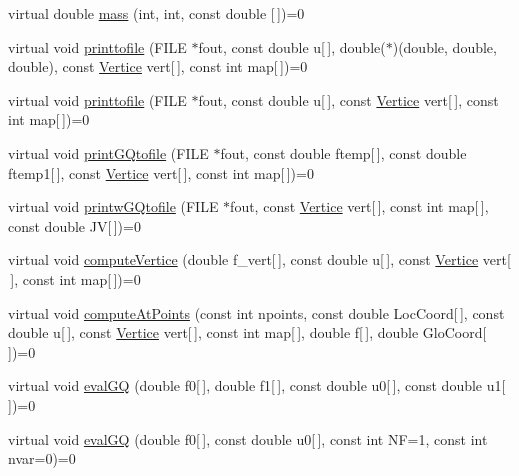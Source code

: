 \begin{DoxyCompactItemize}
\item 
virtual double \hyperlink{classStdel_ab475cc8bc82a3b8a5200d4d841ef0a51}{mass} (int, int, const double \mbox{[}$\,$\mbox{]})=0
\item 
virtual void \hyperlink{classStdel_a315869f4c1fe1fdf4911c0d4ab092176}{printtofile} (F\+I\+LE $\ast$fout, const double u\mbox{[}$\,$\mbox{]}, double($\ast$)(double, double, double), const \hyperlink{structVertice}{Vertice} vert\mbox{[}$\,$\mbox{]}, const int map\mbox{[}$\,$\mbox{]})=0
\item 
virtual void \hyperlink{classStdel_a6863f8aeb8e4fb01299b109b0dd3fe13}{printtofile} (F\+I\+LE $\ast$fout, const double u\mbox{[}$\,$\mbox{]}, const \hyperlink{structVertice}{Vertice} vert\mbox{[}$\,$\mbox{]}, const int map\mbox{[}$\,$\mbox{]})=0
\item 
virtual void \hyperlink{classStdel_a8196ddf2ec3c88627e33d19f93fdb354}{print\+G\+Qtofile} (F\+I\+LE $\ast$fout, const double ftemp\mbox{[}$\,$\mbox{]}, const double ftemp1\mbox{[}$\,$\mbox{]}, const \hyperlink{structVertice}{Vertice} vert\mbox{[}$\,$\mbox{]}, const int map\mbox{[}$\,$\mbox{]})=0
\item 
virtual void \hyperlink{classStdel_aec7751f7873772d930c91cf93ec6b07b}{printw\+G\+Qtofile} (F\+I\+LE $\ast$fout, const \hyperlink{structVertice}{Vertice} vert\mbox{[}$\,$\mbox{]}, const int map\mbox{[}$\,$\mbox{]}, const double JV\mbox{[}$\,$\mbox{]})=0
\item 
virtual void \hyperlink{classStdel_a74eed41f670878759c84e2014b4a2cd5}{compute\+Vertice} (double f\+\_\+vert\mbox{[}$\,$\mbox{]}, const double u\mbox{[}$\,$\mbox{]}, const \hyperlink{structVertice}{Vertice} vert\mbox{[}$\,$\mbox{]}, const int map\mbox{[}$\,$\mbox{]})=0
\item 
virtual void \hyperlink{classStdel_a03e038055d238608efce470629863c36}{compute\+At\+Points} (const int npoints, const double Loc\+Coord\mbox{[}$\,$\mbox{]}, const double u\mbox{[}$\,$\mbox{]}, const \hyperlink{structVertice}{Vertice} vert\mbox{[}$\,$\mbox{]}, const int map\mbox{[}$\,$\mbox{]}, double f\mbox{[}$\,$\mbox{]}, double Glo\+Coord\mbox{[}$\,$\mbox{]})=0
\item 
virtual void \hyperlink{classStdel_aac725224c4c3433228ca6841fe7aba49}{eval\+GQ} (double f0\mbox{[}$\,$\mbox{]}, double f1\mbox{[}$\,$\mbox{]}, const double u0\mbox{[}$\,$\mbox{]}, const double u1\mbox{[}$\,$\mbox{]})=0
\item 
virtual void \hyperlink{classStdel_ae144597c3199b1757a5fbbc255e17baa}{eval\+GQ} (double f0\mbox{[}$\,$\mbox{]}, const double u0\mbox{[}$\,$\mbox{]}, const int NF=1, const int nvar=0)=0

\end{DoxyCompactItemize}

